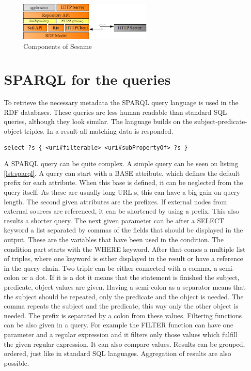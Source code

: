 \begin{figure}[h]
\centering
\includegraphics[width=0.6\textwidth]{figures/sesame-components.png}
\caption{Components of Sesame\label{fig:sesame}}
\end{figure}

\section{SPARQL for the queries}

To retrieve the necessary metadata the SPARQL query language is used in the RDF databases. These queries are less human readable than standard SQL queries, although they look similar. The language builds on the subject-predicate-object triples. In a result all matching data is responded. 

\begin{lstlisting}[caption={Sample SPARQL that queries all filterable objects\label{lst:sparql}}]
select ?s { <uri#filterable> <uri#subPropertyOf> ?s }
\end{lstlisting}

A SPARQL query can be quite complex. A simple query can be seen on listing \ref{lst:sparql}. A query can start with a BASE attribute, which defines the default prefix for each attribute. When this base is defined, it can be neglected from the query itself. As these are usually long URL-s, this can have a big gain on query length. The second given attributes are the prefixes. If external nodes from external sources are referenced, it can be shortened by using a prefix. This also results a shorter query. The next given parameter can be after a SELECT keyword a list separated by commas of the fields that should be displayed in the output. These are the variables that have been used in the condition. 
The condition part starts with the WHERE keyword. After that comes a multiple list of triples, where one keyword is either displayed in the result or have a reference in the query chain. Two triple can be either connected with a comma, a semi-colon or a dot. If it is a dot it means that the statement is finished the subject, predicate, object values are given. Having a semi-colon as a separator means that the subject should be repeated, only the predicate and the object is needed. The comma repeats the subject and the predicate, this way only the other object is needed. The prefix is separated by a colon from these values. Filtering functions can be also given in a query. For example the FILTER function can have one parameter and a regular expression and it filters only those values which fulfill the given regular expression. It can also compare values. Results can be grouped, ordered, just like in standard SQL languages. Aggregation of results are also possible. 

